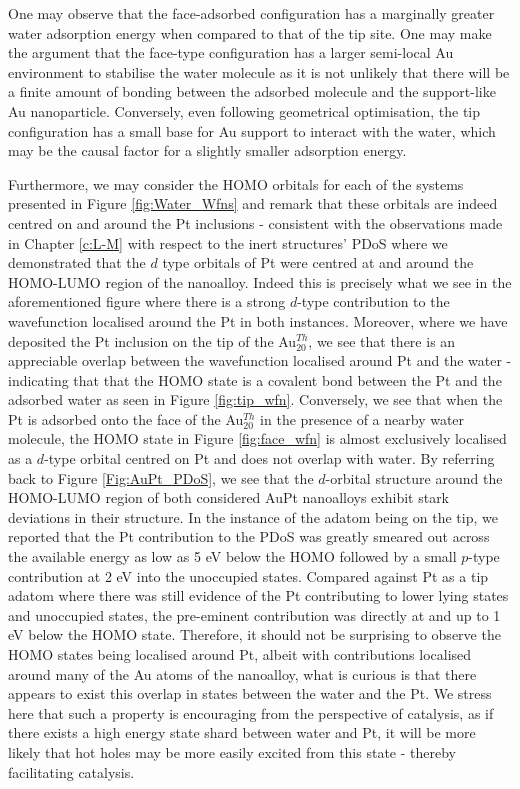 One may observe that the face-adsorbed configuration has a marginally greater water adsorption energy when compared to that of the tip site. One may make the argument that the face-type configuration has a larger semi-local Au environment to stabilise the water molecule as it is not unlikely that there will be a finite amount of bonding between the adsorbed molecule and the support-like Au nanoparticle. Conversely, even following geometrical optimisation, the tip configuration has a small base for Au support to interact with the water, which may be the causal factor for a slightly smaller adsorption energy.

Furthermore, we may consider the HOMO orbitals for each of the systems presented in Figure \ref{fig:Water_Wfns} and remark that these orbitals are indeed centred on and around the Pt inclusions - consistent with the observations made in Chapter \ref{c:L-M} with respect to the inert structures' PDoS where we demonstrated that the $d$ type orbitals of Pt were centred at and around the HOMO-LUMO region of the nanoalloy. Indeed this is precisely what we see  in the aforementioned figure where there is a strong $d$-type contribution to the wavefunction localised around the Pt in both instances. Moreover, where we have deposited the Pt inclusion on the tip of the Au$_{20}^{Th}$, we see that there is an appreciable overlap between the wavefunction localised around Pt and the water - indicating that that the HOMO state is a covalent bond between the Pt and the adsorbed water as seen in Figure \ref{fig:tip_wfn}. Conversely, we see that when the Pt is adsorbed onto the face of the Au$_{20}^{Th}$ in the presence of a nearby water molecule, the HOMO state in Figure \ref{fig:face_wfn} is almost exclusively localised as a $d$-type orbital centred on Pt and does not overlap with water. By referring back to Figure \ref{Fig:AuPt_PDoS}, we see that the $d$-orbital structure around the HOMO-LUMO region of both considered AuPt nanoalloys exhibit stark deviations in their structure. In the instance of the adatom being on the tip, we reported that the Pt contribution to the PDoS was greatly smeared out across the available energy as low as 5 eV below the HOMO followed by a small $p$-type contribution at 2 eV into the unoccupied states. Compared against Pt as a tip adatom where there was still evidence of the Pt contributing to lower lying states and unoccupied states, the pre-eminent contribution was directly at and up to 1 eV below the HOMO state. Therefore, it should not be surprising to observe the HOMO states being localised around Pt, albeit with contributions localised around many of the Au atoms of the nanoalloy, what is curious is that there appears to exist this overlap in states between the water and the Pt. We stress here that such a property is encouraging from the perspective of catalysis, as if there exists a high energy state shard between water and Pt, it will be more likely that hot holes may be more easily excited from this state - thereby facilitating catalysis.


